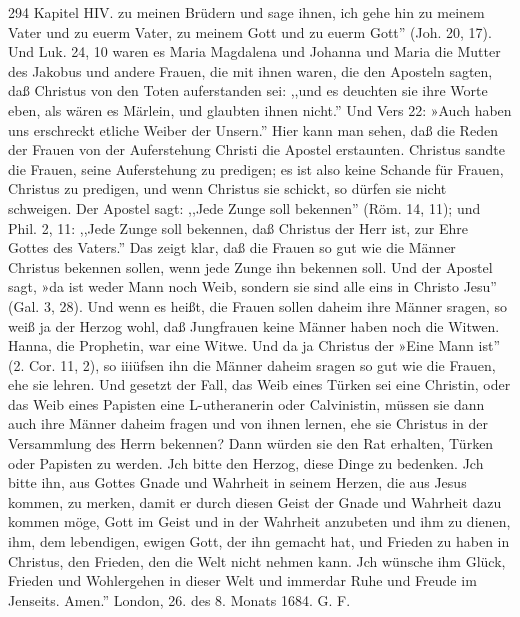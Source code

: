 294 Kapitel HIV.
zu meinen Brüdern und sage ihnen, ich gehe hin zu meinem
Vater und zu euerm Vater, zu meinem Gott und zu euerm Gott''
(Joh. 20, 17). Und Luk. 24, 10 waren es Maria Magdalena und
Johanna und Maria die Mutter des Jakobus und andere Frauen,
die mit ihnen waren, die den Aposteln sagten, daß Christus von
den Toten auferstanden sei: ,,und es deuchten sie ihre Worte eben,
als wären es Märlein, und glaubten ihnen nicht.'' Und Vers 22:
»Auch haben uns erschreckt etliche Weiber der Unsern.'' Hier
kann man sehen, daß die Reden der Frauen von der Auferstehung
Christi die Apostel erstaunten. Christus sandte die Frauen, seine
Auferstehung zu predigen; es ist also keine Schande für Frauen,
Christus zu predigen, und wenn Christus sie schickt, so dürfen sie
nicht schweigen. Der Apostel sagt: ,,Jede Zunge soll bekennen''
(Röm. 14, 11); und Phil. 2, 11: ,,Jede Zunge soll bekennen, daß
Christus der Herr ist, zur Ehre Gottes des Vaters.'' Das zeigt
klar, daß die Frauen so gut wie die Männer Christus bekennen
sollen, wenn jede Zunge ihn bekennen soll. Und der Apostel sagt,
»da ist weder Mann noch Weib, sondern sie sind alle eins in
Christo Jesu'' (Gal. 3, 28). Und wenn es heißt, die Frauen
sollen daheim ihre Männer sragen, so weiß ja der Herzog wohl,
daß Jungfrauen keine Männer haben noch die Witwen. Hanna,
die Prophetin, war eine Witwe. Und da ja Christus der »Eine
Mann ist'' (2. Cor. 11, 2), so iiiüfsen ihn die Männer daheim
sragen so gut wie die Frauen, ehe sie lehren. Und gesetzt der
Fall, das Weib eines Türken sei eine Christin, oder das Weib
eines Papisten eine L-utheranerin oder Calvinistin, müssen sie
dann auch ihre Männer daheim fragen und von ihnen lernen, ehe
sie Christus in der Versammlung des Herrn bekennen? Dann
würden sie den Rat erhalten, Türken oder Papisten zu werden.
Jch bitte den Herzog, diese Dinge zu bedenken. Jch bitte
ihn, aus Gottes Gnade und Wahrheit in seinem Herzen, die aus
Jesus kommen, zu merken, damit er durch diesen Geist der
Gnade und Wahrheit dazu kommen möge, Gott im Geist und in
der Wahrheit anzubeten und ihm zu dienen, ihm, dem lebendigen,
ewigen Gott, der ihn gemacht hat, und Frieden zu haben in
Christus, den Frieden, den die Welt nicht nehmen kann. Jch
wünsche ihm Glück, Frieden und Wohlergehen in dieser Welt und
immerdar Ruhe und Freude im Jenseits. Amen.''
London, 26. des 8. Monats 1684. G. F.


